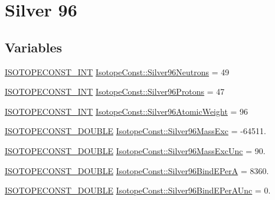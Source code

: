 \hypertarget{group___isotope_const-_silver-_ag96}{}\section{Silver 96}
\label{group___isotope_const-_silver-_ag96}
\subsection*{Variables}
\begin{DoxyCompactItemize}
\item 
\mbox{\hyperlink{group___isotope_const-_macros_ga5f18360b3e99483a35c32d789e62621c}{I\+S\+O\+T\+O\+P\+E\+C\+O\+N\+S\+T\+\_\+\+I\+NT}} \mbox{\hyperlink{group___isotope_const-_silver-_ag96_ga478b3dc8b1b3c42cfd5b13379fef869b}{Isotope\+Const\+::\+Silver96\+Neutrons}} = 49
\item 
\mbox{\hyperlink{group___isotope_const-_macros_ga5f18360b3e99483a35c32d789e62621c}{I\+S\+O\+T\+O\+P\+E\+C\+O\+N\+S\+T\+\_\+\+I\+NT}} \mbox{\hyperlink{group___isotope_const-_silver-_ag96_ga983a8b2c34e750eaeae6b1db4a90dcae}{Isotope\+Const\+::\+Silver96\+Protons}} = 47
\item 
\mbox{\hyperlink{group___isotope_const-_macros_ga5f18360b3e99483a35c32d789e62621c}{I\+S\+O\+T\+O\+P\+E\+C\+O\+N\+S\+T\+\_\+\+I\+NT}} \mbox{\hyperlink{group___isotope_const-_silver-_ag96_ga0a44a4ef10567ec5cbb04d494cbe22b2}{Isotope\+Const\+::\+Silver96\+Atomic\+Weight}} = 96
\item 
\mbox{\hyperlink{group___isotope_const-_macros_ga8f45a7272ce02c0b4c65c44636ed719a}{I\+S\+O\+T\+O\+P\+E\+C\+O\+N\+S\+T\+\_\+\+D\+O\+U\+B\+LE}} \mbox{\hyperlink{group___isotope_const-_silver-_ag96_ga1ceb233a4ac61ed209308e0df2259efe}{Isotope\+Const\+::\+Silver96\+Mass\+Exc}} = -\/64511.
\item 
\mbox{\hyperlink{group___isotope_const-_macros_ga8f45a7272ce02c0b4c65c44636ed719a}{I\+S\+O\+T\+O\+P\+E\+C\+O\+N\+S\+T\+\_\+\+D\+O\+U\+B\+LE}} \mbox{\hyperlink{group___isotope_const-_silver-_ag96_ga55a7698ae853e83b930ccb960bcceb9f}{Isotope\+Const\+::\+Silver96\+Mass\+Exc\+Unc}} = 90.
\item 
\mbox{\hyperlink{group___isotope_const-_macros_ga8f45a7272ce02c0b4c65c44636ed719a}{I\+S\+O\+T\+O\+P\+E\+C\+O\+N\+S\+T\+\_\+\+D\+O\+U\+B\+LE}} \mbox{\hyperlink{group___isotope_const-_silver-_ag96_ga4c353378e9a7b3beff2ae206450456d0}{Isotope\+Const\+::\+Silver96\+Bind\+E\+PerA}} = 8360.
\item 
\mbox{\hyperlink{group___isotope_const-_macros_ga8f45a7272ce02c0b4c65c44636ed719a}{I\+S\+O\+T\+O\+P\+E\+C\+O\+N\+S\+T\+\_\+\+D\+O\+U\+B\+LE}} \mbox{\hyperlink{group___isotope_const-_silver-_ag96_gac33e105c2851d6273a0f838f106b654a}{Isotope\+Const\+::\+Silver96\+Bind\+E\+Per\+A\+Unc}} = 0.

\end{DoxyCompactItemize}
